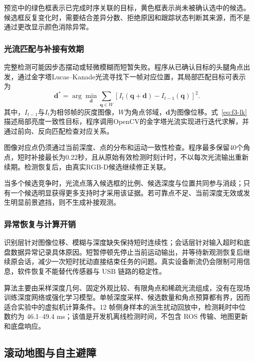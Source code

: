 预览中的绿色框表示已完成时序关联的目标，黄色框表示尚未被确认选中的候选。候选框反复变化时，需要结合差异分数、拒绝原因和跟踪状态判断其来源，而不是通过更改显示颜色消除异常。

\subsubsection{光流匹配与补接有效期}
完整检测可能因步态摆动或轻微模糊而短暂失败。程序从已确认目标的头腿角点出发，通过金字塔Lucas--Kanade光流寻找下一帧对应位置，其局部匹配目标可表示为
\begin{equation}\label{eq:f3-lk}
\mathbf d^{*}=\arg\min_{\mathbf d}
\sum_{\mathbf q\in W}
\left[I_t(\mathbf q+\mathbf d)-I_{t-1}(\mathbf q)\right]^2.
\end{equation}
其中，$I_{t-1}$与$I_t$为相邻帧的灰度图像，$W$为角点邻域，$\mathbf d$为图像位移。式~\eqref{eq:f3-lk}描述局部亮度一致性目标，程序调用OpenCV的金字塔光流实现进行迭代求解，并通过前向、反向匹配检查对应关系。\cite{f3-lk-foundation}

图像对应点仍须通过当前深度、点的分布和运动一致性检查。程序最多保留40个角点，短时补接最长为0.22秒，且从原始有效检测时刻计时，不以每次光流输出重新续期。检测恢复后，由真实RGB-D候选继续修正关联。

当多个候选竞争时，光流点落入候选框的比例、候选深度与位置共同参与消歧；只有一个候选明显获得更多支持时才采用该证据。若可靠点不足、当前深度无效或发生明显前景遮挡，则不生成补接观测。

\subsubsection{异常恢复与计算开销}
识别层针对图像位移、模糊与深度缺失保持短时连续性；会话层针对输入超时和底盘数据异常记录具体原因。短暂停顿先停止当前运动输出，并等待新观测恢复后继续原会话，减少一次短时扰动直接结束任务的问题。真实设备断流仍会限制可用信息，软件恢复不能替代传感器与 USB 链路的稳定性。

算法主要由采样深度几何、固定外观比较、有限角点和稀疏光流组成，没有在现场训练深度网络或强化学习模型。单帧深度采样、候选数量和角点预算都有界，因而适合实验中的虚拟机计算条件。12 帧侧身样本的派生扰动回放中，检测耗时中位数约为 46.1--49.4 ms；该值是开发机离线检测时间，不包含 ROS 传输、地图更新和底盘响应。



\FloatBarrier
{}
\subsection{滚动地图与自主避障}\label{sec:f3-navigation}
